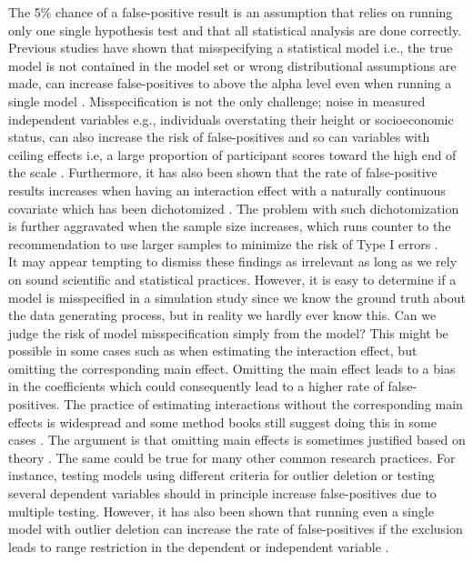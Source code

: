 The 5\% chance of a false-positive result is an assumption that relies on running only one single hypothesis test and that all statistical analysis are done correctly. Previous studies have shown that misspecifying a statistical model i.e., the true model is not contained in the model set or wrong distributional assumptions are made, can increase false-positives to above the alpha level even when running a single model \citep{Dennis2019,Litiere07}. Misspecification is not the only challenge; noise in measured independent variables e.g., individuals overstating their height or socioeconomic status, can also increase the risk of false-positives \citep{Brunner2009} and so can variables with ceiling effects i.e, a large proportion of participant scores toward the high end of the scale \citep{Austin2003}. Furthermore, it has also been shown that the rate of false-positive results increases when having an interaction effect with a naturally continuous covariate which has been dichotomized \citep{Austin2004, maxwell1993bivariate}. The problem with such dichotomization is further aggravated when the sample size increases, which runs counter to the recommendation to use larger samples to minimize the risk of Type I errors \citep{simmons2018}. 
\\
It may appear tempting to dismiss these findings as irrelevant as long as we rely on sound scientific and statistical practices. However, it is easy to determine if a model is misspecified in a simulation study since we know the ground truth about the data generating process, but in reality we hardly ever know this. Can we judge the risk of model misspecification simply from the model? This might be possible in some cases such as when estimating the interaction effect, but omitting the corresponding main effect. Omitting the main effect leads to a bias in the coefficients \citep{Branbor2006} which could consequently lead to a higher rate of false-positives. The practice of estimating interactions without the corresponding main effects is widespread \citep{Branbor2006} and some method books still suggest doing this in some cases \citep{Cleves2008}. The argument is that omitting main effects is sometimes justified based on theory \citep{aiken1991multiple}. The same could be true for many other common research practices. For instance, testing models using different criteria for outlier deletion or testing several dependent variables should in principle increase false-positives due to multiple testing. However, it has also been shown that running even a single model with outlier deletion can increase the rate of false-positives if the exclusion leads to range restriction in the dependent or independent variable \citep{Raju2003}.  \\        

